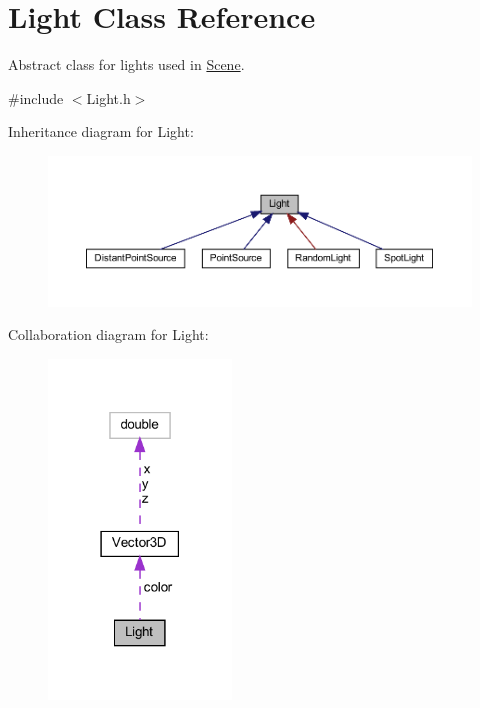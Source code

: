 \hypertarget{classLight}{}\section{Light Class Reference}
\label{classLight}


Abstract class for lights used in \mbox{\hyperlink{classScene}{Scene}}.  




{\ttfamily \#include $<$Light.\+h$>$}



Inheritance diagram for Light\+:
\nopagebreak
\begin{figure}[H]
\begin{center}
\leavevmode
\includegraphics[width=350pt]{classLight__inherit__graph}
\end{center}
\end{figure}


Collaboration diagram for Light\+:
\nopagebreak
\begin{figure}[H]
\begin{center}
\leavevmode
\includegraphics[width=138pt]{classLight__coll__graph}
\end{center}
\end{figure}
